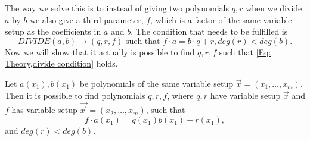 The way we solve this is to instead of giving two polynomials $q,r$ when we divide $a$ by $b$ we also give a third parameter, $f$, which is a factor of the same variable setup as the coefficients in $a$ and $b$. The condition that needs to be fulfilled is
\begin{equation}\label{Eq: Theory,divide condition}
  DIVIDE(a,b) \rightarrow (q,r,f) \text{ such that } f\cdot a=b\cdot q + r, deg(r) < deg(b).
\end{equation}
Now we will show that it actually is possible to find $q,r,f$ such that \ref{Eq: Theory,divide condition} holds.
\begin{theorem}
  Let $a(x_1),b(x_1)$ be polynomials of the same variable setup $\vec{x}=(x_1,\ldots,x_m)$. Then it is possible to find polynomials $q,r,f$, where $q,r$ have variable setup $\vec{x}$ and $f$ has variable setup $\vec{x^\prime}=(x_2,\ldots,x_m)$, such that
  \begin{equation}\label{Eq: Theory,theorem,divide}
    f\cdot a(x_1)=q(x_1)b(x_1) + r(x_1),
  \end{equation}
  and $deg(r)<deg(b)$.
\end{theorem}

